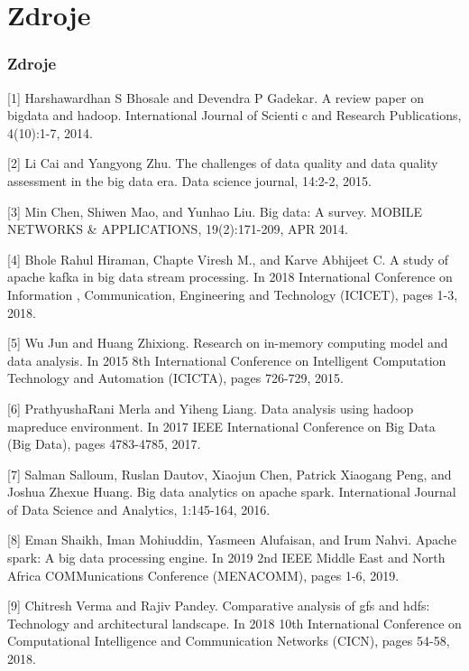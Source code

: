 \documentclass{beamer}
\begin{document}
\section*{Zdroje}
\begin{frame}[allowframebreaks]\frametitle{Zdroje}
[1] Harshawardhan S Bhosale and Devendra P Gadekar.
A review paper on bigdata and hadoop.
International Journal of Scientic and Research Publications, 4(10):1-7, 2014.

[2] Li Cai and Yangyong Zhu.
The challenges of data quality and data quality assessment in the big data era.
Data science journal, 14:2-2, 2015.

[3] Min Chen, Shiwen Mao, and Yunhao Liu.
Big data: A survey.
MOBILE NETWORKS \& APPLICATIONS, 19(2):171-209, APR 2014.

[4] Bhole Rahul Hiraman, Chapte Viresh M., and Karve Abhijeet C.
A study of apache kafka in big data stream processing.
In 2018 International Conference on Information , Communication, Engineering and Technology (ICICET), pages 1-3, 2018.

[5] Wu Jun and Huang Zhixiong.
Research on in-memory computing model and data analysis.
In 2015 8th International Conference on Intelligent Computation Technology and Automation (ICICTA), pages 726-729, 2015.

[6] PrathyushaRani Merla and Yiheng Liang.
Data analysis using hadoop mapreduce environment.
In 2017 IEEE International Conference on Big Data (Big Data), pages 4783-4785, 2017.

[7] Salman Salloum, Ruslan Dautov, Xiaojun Chen, Patrick Xiaogang Peng, and Joshua Zhexue Huang.
Big data analytics on apache spark.
International Journal of Data Science and Analytics, 1:145-164, 2016.

[8] Eman Shaikh, Iman Mohiuddin, Yasmeen Alufaisan, and Irum Nahvi.
Apache spark: A big data processing engine.
In 2019 2nd IEEE Middle East and North Africa COMMunications Conference (MENACOMM), pages 1-6, 2019.

[9] Chitresh Verma and Rajiv Pandey.
Comparative analysis of gfs and hdfs: Technology and architectural landscape.
In 2018 10th International Conference on Computational Intelligence and Communication Networks (CICN), pages 54-58, 2018.
\end{frame}
\end{document}
